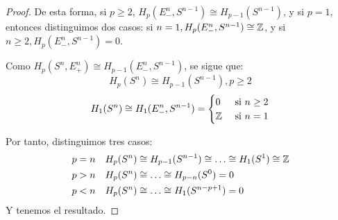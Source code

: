 \begin{proof}
  De esta forma, si $p \geq 2$, $H_p(E_-^n, S^{n-1}) \cong H_{p-1}(S^{n-1})$, y si $p = 1$, entonces distinguimos
  dos casos: si $n = 1, H_p(E_-^n, S^{n-1}) \cong \mathbb{Z}$, y si $n \geq 2, H_p(E_-^n, S^{n-1}) = 0$.

  Como $H_p(S^n, E_+^n) \cong H_{p-1}(E_-^n, S^{n-1})$, se sigue que:
  \[ H_p(S^n) \cong H_{p-1}(S^{n-1}), p \geq 2 \]
  \[ H_1(S^n) \cong H_1(E_-^n, S^{n-1}) = \begin{cases} 0 &\text{ si } n \geq 2 \\ \mathbb{Z} &\text{ si } n = 1 \end{cases} \]

  Por tanto, distinguimos tres casos:
  \begin{align*}
      p = n &\quad H_p(S^n) \cong H_{p-1}(S^{n-1}) \cong \dots \cong H_1(S^1) \cong \mathbb{Z} \\
      p > n &\quad H_p(S^n) \cong \dots \cong H_{p-n}(S^0) = 0 \\
      p < n &\quad H_p(S^n) \cong \dots \cong H_1(S^{n-p+1}) = 0
  \end{align*}
  Y tenemos el resultado.
\end{proof}
